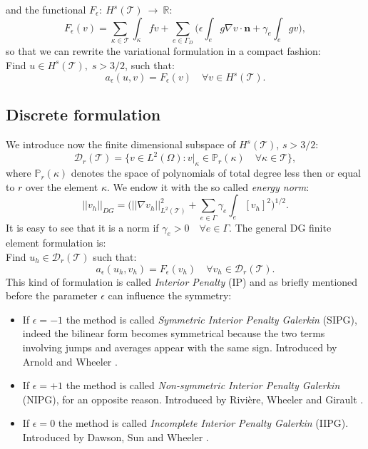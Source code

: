 \documentclass[12pt, a4paper]{article}
\theoremstyle{definition}
\theoremstyle{plain}
\theoremstyle{plain}
\theoremstyle{definition}
\begin{document}
and the functional $F_\epsilon:~H^s(\mathcal{T})~\rightarrow~\mathbb{R}$:
\begin{equation*}
	F_\epsilon(v) = \sum_{\kappa \in \mathcal{T}} \int_\kappa fv
	+ \sum_{e \in \Gamma_D} \bigg( \epsilon \int_e g \nabla v \cdot \mathbf{n}
	+ \gamma_e \int_e gv \bigg),
\end{equation*}
so that we can rewrite the variational formulation in a compact fashion:\\
Find $u \in H^s(\mathcal{T}), \; s>3/2$, such that:
\begin{equation} \label{eq:dgvarform}
	a_\epsilon(u, v) = F_\epsilon(v) \quad \forall v \in H^s(\mathcal{T}).
\end{equation}
\subsection{Discrete formulation}
We introduce now the finite dimensional subspace of $H^s(\mathcal{T})$, $s>3/2$:
\begin{equation} \label{eq:dgspace}
	\mathcal{D}_r(\mathcal{T}) = \{ v \in L^2(\Omega) : v|_\kappa \in 
	\mathbb{P}_r(\kappa) \quad \forall \kappa \in \mathcal{T}  \},
\end{equation}
where $\mathbb{P}_r(\kappa)$ denotes the space of polynomials of total degree 
less then or equal to $r$ over the element $\kappa$. We endow it with the so 
called \textit{energy norm}:
\begin{equation*}
	|\!|v_h|\!|_{DG} = \bigg( |\!|\nabla v_h|\!|^2_{L^2(\mathcal{T})} + \sum_{e \in \Gamma} \gamma_e \int_e [v_h]^2 \bigg)^{1/2}.
\end{equation*}
It is easy to see that it is a norm if $\gamma_e > 0 \quad \forall e \in 
\Gamma$. The general DG finite element formulation is:\\
Find $u_h \in \mathcal{D}_r(\mathcal{T})$ such that:
\begin{equation} \label{eq:dgfemform}
	a_\epsilon(u_h, v_h) = F_\epsilon(v_h) \quad \forall v_h \in 
	\mathcal{D}_r(\mathcal{T}).
\end{equation}
This kind of formulation is called \textit{Interior Penalty} (IP) and as briefly mentioned before the parameter $\epsilon$ can influence the symmetry:
\begin{itemize}
\item
If $\epsilon = -1$ the method is called \textit{Symmetric Interior Penalty 
Galerkin} (SIPG), indeed the bilinear form becomes symmetrical because the 
two terms involving jumps and averages appear with the same sign. Introduced by 
Arnold \cite{arn82} and Wheeler \cite{whe78}.
\item
If  $\epsilon = +1$ the method is called \textit{Non-symmetric Interior Penalty 
Galerkin} (NIPG), for an opposite reason. Introduced by Rivière, Wheeler 
and Girault \cite{rwg}.
\item
If $\epsilon = 0$ the method is called \textit{Incomplete Interior Penalty 
Galerkin} (IIPG). Introduced by Dawson, Sun and Wheeler \cite{dsw}.
\end{itemize}
\end{document}
